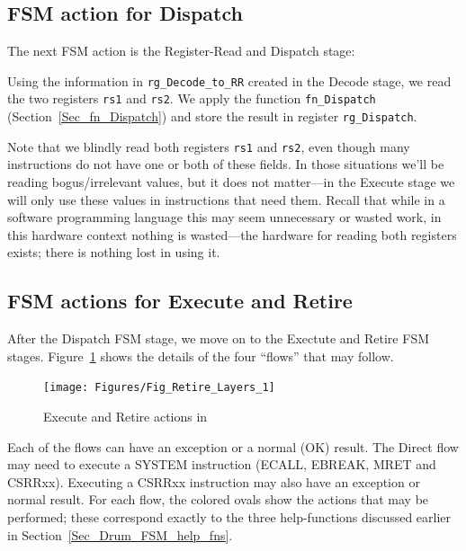 
\subsection{FSM action for Dispatch}

The next FSM action is the Register-Read and Dispatch stage:


Using the information in \verb|rg_Decode_to_RR| created in the Decode
stage, we read the two registers \verb|rs1| and \verb|rs2|.  We apply
the function \verb|fn_Dispatch| (Section~\ref{Sec_fn_Dispatch}) and
store the result in register \verb|rg_Dispatch|.

Note that we blindly read both registers \verb|rs1| and \verb|rs2|,
even though many instructions do not have one or both of these fields.
In those situations we'll be reading bogus/irrelevant values, but it
does not matter---in the Execute stage we will only use these values
in instructions that need them. Recall that while in a software
programming language this may seem unnecessary or wasted work, in this
hardware context nothing is wasted---the hardware for reading both
registers exists; there is nothing lost in using it.


\subsection{FSM actions for Execute and Retire}

After the Dispatch FSM stage, we move on to the Exectute and Retire
FSM stages.  Figure~\ref{Fig_Retire_Drum} shows the details of the
four ``flows'' that may follow.
\begin{figure}[htbp]
  \centerline{\texttt{[image: Figures/Fig\_Retire\_Layers\_1]}}
  \caption{\label{Fig_Retire_Drum}Execute and Retire actions in {\DRUM}}
\end{figure}
Each of the flows can have an exception or a normal (OK) result.  The
Direct flow may need to execute a SYSTEM instruction (ECALL, EBREAK,
MRET and CSRRxx).  Executing a CSRRxx instruction may also have an
exception or normal result.  For each flow, the colored ovals show the
actions that may be performed; these correspond exactly to the three
help-functions discussed earlier in
Section~\ref{Sec_Drum_FSM_help_fns}.

